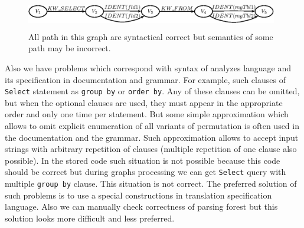 \documentclass{llncs}
\begin{document}
\begin{figure}
    \begin{center}
        \includegraphics[width=11cm,height=1.3cm]{graphs/semantics_example.eps}
        \caption{ All path in this graph are syntactical correct but semantics of some path may be incorrect.}
        \label{pic7}
    \end{center}
\end{figure}


Also we have problems which correspond with syntax of analyzes language and its specification in documentation and grammar. For example, such clauses of \verb|Select| statement as \verb|group by| or \verb|order by|. Any of these clauses can be omitted, but when the optional clauses are used, they must appear in the appropriate order and only one time per statement. But some simple approximation which allows to omit explicit enumeration of all variants of permutation is often used in the documentation and the grammar. Such approximation allows to accept input strings with arbitrary repetition of clauses (multiple repetition of one clause also possible). In the stored code such situation is not possible because this code should be correct but during graphs processing we can get \verb|Select| query with multiple \verb|group by| clause. This situation is not correct. The preferred solution of such problems is to use a special constructions in translation specification language. Also we can manually check correctness of parsing forest but this solution looks more difficult and less preferred.
\end{document}
